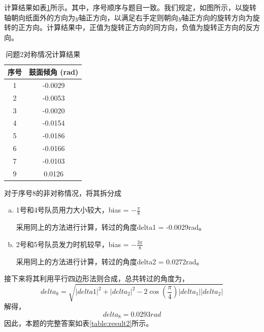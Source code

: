 \documentclass[nocover]{cumcmart}%
\begin{document}
计算结果如表\ref{table:result}所示。其中，序号顺序与题目一致。我们规定，如图所示，以旋转轴朝向纸面外的方向为$y$轴正方向，以满足右手定则朝向$y$轴正方向的旋转方向为旋转的正方向。计算结果中，正值为旋转正方向的同方向，负值为旋转正方向的反方向。
\begin{table} [!h]
\begin{center}
\vspace{-0.1in}
\caption{问题2对称情况计算结果}
\label{table:result}
\begin{tabular}{|c|c|}
\hline
\textbf{序号}&\textbf{鼓面倾角 (rad)}\\
\hline
1&-0.0029
\\
\hline
2& -0.0053\\
\hline
3& -0.0020
\\
\hline
4&-0.0154\\
\hline
5&-0.0186\\
\hline
6&-0.0166\\
\hline
7&-0.0103
\\
\hline
9&0.0126
\\
\hline
\end{tabular}
\vspace{-0.2in}
\end{center}
\end{table}     

对于序号8的非对称情况，将其拆分成
\begin{enumerate}[(a)]
    \item 1号和4号队员用力大小较大，bias = $-\frac{\pi}{8}$
    
    采用同上的方法进行计算，转过的角度delta1 = -0.0029rad。
    \item 2号和5号队员发力时机较早，bias = $-\frac{3\pi}{8}$
    
    采用同上的方法进行计算，转过的角度delta2 = 0.0272rad。
\end{enumerate}
接下来将其利用平行四边形法则合成，总共转过的角度为，
$$delta_8 = \sqrt{|delta1|^2 + |delta_2|^2 - 2\cos{(\frac{\pi}{4})}|delta_1||delta_2|}$$
解得，
$$delta_8 = 0.0293rad$$
因此，本题的完整答案如表\ref{table:result2}所示。
\end{document}
